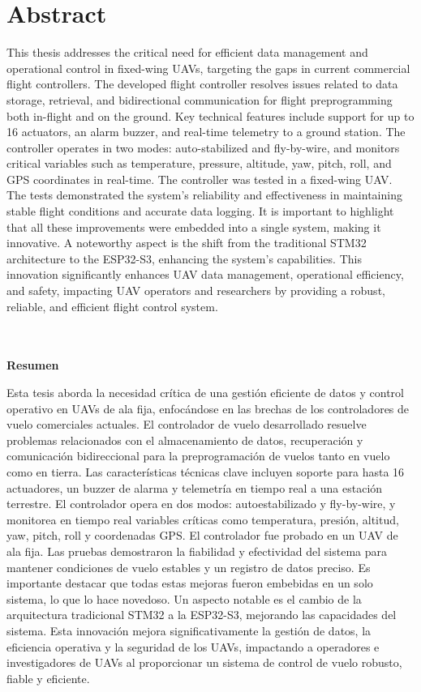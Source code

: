   \section{Abstract}

This thesis addresses the critical need for efficient data management and operational control in fixed-wing UAVs, targeting the gaps in current commercial flight controllers. The developed flight controller resolves issues related to data storage, retrieval, and bidirectional communication for flight preprogramming both in-flight and on the ground. Key technical features include support for up to 16 actuators, an alarm buzzer, and real-time telemetry to a ground station. The controller operates in two modes: auto-stabilized and fly-by-wire, and monitors critical variables such as temperature, pressure, altitude, yaw, pitch, roll, and GPS coordinates in real-time. The controller was tested in a fixed-wing UAV. The tests demonstrated the system's reliability and effectiveness in maintaining stable flight conditions and accurate data logging. It is important to highlight that all these improvements were embedded into a single system, making it innovative. A noteworthy aspect is the shift from the traditional STM32 architecture to the ESP32-S3, enhancing the system's capabilities. This innovation significantly enhances UAV data management, operational efficiency, and safety, impacting UAV operators and researchers by providing a robust, reliable, and efficient flight control system.\\ \\ \\


\begin{center}
    \textbf{\LARGE{Resumen}} 
\end{center}

\vspace{10 px}
Esta tesis aborda la necesidad crítica de una gestión eficiente de datos y control operativo en UAVs de ala fija, enfocándose en las brechas de los controladores de vuelo comerciales actuales. El controlador de vuelo desarrollado resuelve problemas relacionados con el almacenamiento de datos, recuperación y comunicación bidireccional para la preprogramación de vuelos tanto en vuelo como en tierra. Las características técnicas clave incluyen soporte para hasta 16 actuadores, un buzzer de alarma y telemetría en tiempo real a una estación terrestre. El controlador opera en dos modos: autoestabilizado y fly-by-wire, y monitorea en tiempo real variables críticas como temperatura, presión, altitud, yaw, pitch, roll y coordenadas GPS. El controlador fue probado en un UAV de ala fija. Las pruebas demostraron la fiabilidad y efectividad del sistema para mantener condiciones de vuelo estables y un registro de datos preciso. Es importante destacar que todas estas mejoras fueron embebidas en un solo sistema, lo que lo hace novedoso. Un aspecto notable es el cambio de la arquitectura tradicional STM32 a la ESP32-S3, mejorando las capacidades del sistema. Esta innovación mejora significativamente la gestión de datos, la eficiencia operativa y la seguridad de los UAVs, impactando a operadores e investigadores de UAVs al proporcionar un sistema de control de vuelo robusto, fiable y eficiente. 